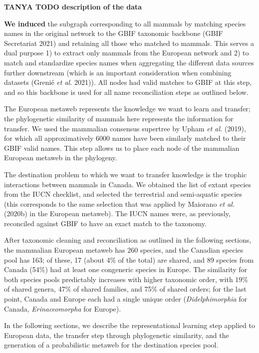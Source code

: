 \documentclass[11pt]{article}
\makeatletter
\def\maxwidth{\ifdim\Gin@nat@width>\linewidth\linewidth
\else\Gin@nat@width\fi}
\let\Oldincludegraphics\includegraphics
\renewcommand{\includegraphics}[1]{\Oldincludegraphics[width=\maxwidth]{#1}}
\providecommand{\DIFaddtex}[1]{{\bf #1}} %
\providecommand{\DIFaddend}{\protect\color{black}} %
\providecommand{\DIFadd}[1]{\texorpdfstring{\DIFaddtex{#1}}{#1}} %
\DeclareRobustCommand{\DIFaddend}{\DIFOaddend \let\includegraphics\DIFOincludegraphics} %
\makeatother
\begin{document}
\DIFadd{\textbf{TANYA TODO} description of the data
}

\DIFadd{We induced }\DIFaddend the subgraph corresponding to all mammals by matching species
names in the original network to the GBIF taxonomic backbone (GBIF
Secretariat 2021) and retaining all those who matched to mammals. This
serves a dual purpose 1) to extract only mammals from the European
network and 2) to match and standardize species names when aggregating
the different data sources further downstream (which is an important
consideration when combining datasets (Grenié \emph{et al.} 2021)). All
nodes had valid matches to GBIF at this step, and so this backbone is
used for all name reconciliation steps as outlined below.

The European metaweb represents the knowledge we want to learn and
transfer; the phylogenetic similarity of mammals here represents the
information for transfer. We used the mammalian consensus supertree by
Upham \emph{et al.} (2019), for which all approximatively 6000 names
have been similarly matched to their GBIF valid names. This step allows
us to place each node of the mammalian European metaweb in the
phylogeny.

The destination problem to which we want to transfer knowledge is the
trophic interactions between mammals in Canada. We obtained the list of
extant species from the IUCN checklist, and selected the terrestrial and
semi-aquatic species (this corresponds to the same selection that was
applied by Maiorano \emph{et al.} (2020b) in the European metaweb). The
IUCN names were, as previously, reconciled against GBIF to have an exact
match to the taxonomy.

After taxonomic cleaning and reconciliation as outlined in the following
sections, the mammalian European metaweb has 260 species, and the
Canadian species pool has 163; of these, 17 (about 4\% of the total) are
shared, and 89 species from Canada (54\%) had at least one congeneric
species in Europe. The similarity for both species pools predictably
increases with higher taxonomic order, with 19\% of shared genera, 47\%
of shared families, and 75\% of shared orders; for the last point,
Canada and Europe each had a single unique order (\emph{Didelphimorphia}
for Canada, \emph{Erinaceomorpha} for Europe).

In the following sections, we describe the representational learning
step applied to European data, the transfer step through phylogenetic
similarity, and the generation of a probabilistic metaweb for the
destination species pool.
\end{document}
